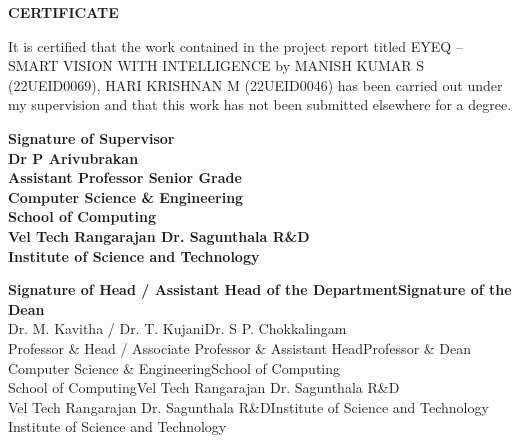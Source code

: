 \documentclass[10pt,openany]{report}
\begin{document}
\begin{center}
{\Huge \textbf{CERTIFICATE}}\\[1cm]
\end{center}
\linespread{1.5}
\large{It is certified that the work contained in the project report titled EYEQ – SMART VISION WITH INTELLIGENCE  by MANISH KUMAR S (22UEID0069), HARI KRISHNAN M (22UEID0046) has been carried out under my supervision and that this work has not
been submitted elsewhere for a degree.}
\vspace{1.5cm}
\begin{flushright}
\textbf{Signature of Supervisor}\\[0.25cm]
\textbf{Dr P Arivubrakan}\\[0.15cm]
\textbf{Assistant Professor Senior Grade}\\[0.15cm]
\textbf{Computer Science \& Engineering}\\[0.15cm]
\textbf{School of Computing}\\[0.15cm]
\textbf{Vel Tech Rangarajan Dr. Sagunthala R\&D}\\[0.15cm]
\textbf{Institute of Science and Technology}\\[2.0cm]
\end{flushright}
\begin{flushleft}
\textbf{Signature of Head / Assistant Head of the Department}\hfill\textbf{Signature of the Dean}\\[0.5cm]
Dr. M. Kavitha / Dr. T. Kujani\hfill Dr. S P. Chokkalingam\\
Professor \& Head / Associate Professor \& Assistant Head\hfill Professor \& Dean\\
Computer Science \& Engineering\hfill School of Computing\\
School of Computing\hfill Vel Tech Rangarajan Dr. Sagunthala R\&D\\
Vel Tech Rangarajan Dr. Sagunthala R\&D\hfill Institute of Science and Technology\\
Institute of Science and Technology
\end{flushleft}
\end{document}

